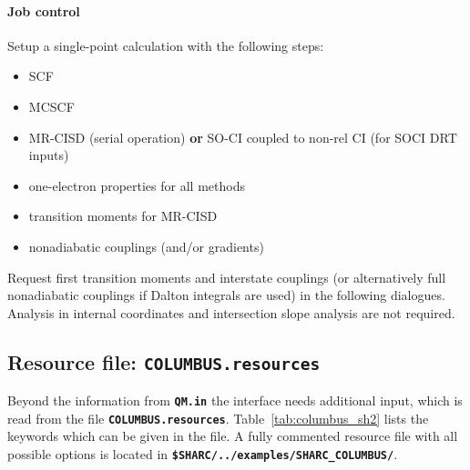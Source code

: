 \documentclass[a4paper,10pt,DIV=15,openany]{scrbook}
\newcommand{\ttt}[1]{\textbf{\texttt{#1}}}
\begin{document}
\paragraph{Job control}

Setup a single-point calculation with the following steps:
\begin{itemize}
  \item SCF
  \item MCSCF
  \item MR-CISD (serial operation) \textbf{or} SO-CI coupled to non-rel CI (for SOCI DRT inputs)
  \item one-electron properties for all methods
  \item transition moments for MR-CISD
  \item nonadiabatic couplings (and/or gradients)
\end{itemize}

Request first transition moments and interstate couplings (or alternatively full nonadiabatic couplings if Dalton integrals are used) in the following dialogues. Analysis in internal coordinates and intersection slope analysis are not required.

\subsection{Resource file: \ttt{COLUMBUS.resources}}

Beyond the information from \ttt{QM.in} the interface needs additional input, which is read from the file \ttt{COLUMBUS.resources}. Table~\ref{tab:columbus_sh2} lists the keywords which can be given in the file.
A fully commented resource file with all possible options is located in \ttt{\$SHARC/../examples/SHARC\_COLUMBUS/}.
\end{document}
